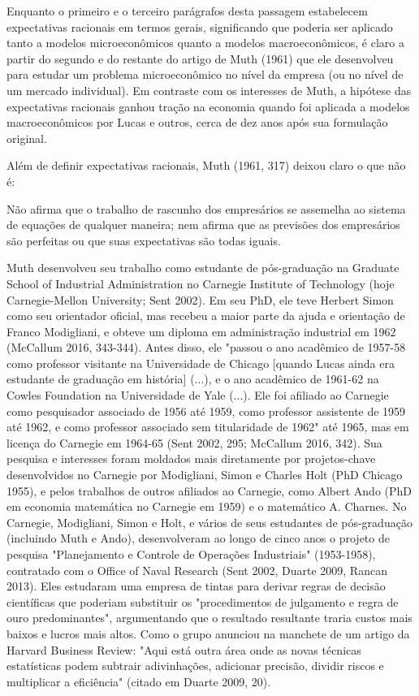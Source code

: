 \documentclass[12pt]{article}
\begin{document}
Enquanto o primeiro e o terceiro parágrafos desta passagem estabelecem expectativas racionais em termos gerais, significando que poderia ser aplicado tanto a modelos microeconômicos quanto a modelos macroeconômicos, é claro a partir do segundo e do restante do artigo de Muth (1961) que ele desenvolveu para estudar um problema microeconômico no nível da empresa (ou no nível de um mercado individual). Em contraste com os interesses de Muth, a hipótese das expectativas racionais ganhou tração na economia quando foi aplicada a modelos macroeconômicos por Lucas e outros, cerca de dez anos após sua formulação original.

Além de definir expectativas racionais, Muth (1961, 317) deixou claro o que não é:

Não afirma que o trabalho de rascunho dos empresários se assemelha ao sistema de equações de qualquer maneira; nem afirma que as previsões dos empresários são perfeitas ou que suas expectativas são todas iguais.

Muth desenvolveu seu trabalho como estudante de pós-graduação na Graduate School of Industrial Administration no Carnegie Institute of Technology (hoje Carnegie-Mellon University; Sent 2002). Em seu PhD, ele teve Herbert Simon como seu orientador oficial, mas recebeu a maior parte da ajuda e orientação de Franco Modigliani, e obteve um diploma em administração industrial em 1962 (McCallum 2016, 343-344). Antes disso, ele "passou o ano acadêmico de 1957-58 como professor visitante na Universidade de Chicago [quando Lucas ainda era estudante de graduação em história] (...), e o ano acadêmico de 1961-62 na Cowles Foundation na Universidade de Yale (...). Ele foi afiliado ao Carnegie como pesquisador associado de 1956 até 1959, como professor assistente de 1959 até 1962, e como professor associado sem titularidade de 1962" até 1965, mas em licença do Carnegie em 1964-65 (Sent 2002, 295; McCallum 2016, 342).
Sua pesquisa e interesses foram moldados mais diretamente por projetos-chave desenvolvidos no Carnegie por Modigliani, Simon e Charles Holt (PhD Chicago 1955), e pelos trabalhos de outros afiliados ao Carnegie, como Albert Ando (PhD em economia matemática no Carnegie em 1959) e o matemático A. Charnes. No Carnegie, Modigliani, Simon e Holt, e vários de seus estudantes de pós-graduação (incluindo Muth e Ando), desenvolveram ao longo de cinco anos o projeto de pesquisa "Planejamento e Controle de Operações Industriais" (1953-1958), contratado com o Office of Naval Research (Sent 2002, Duarte 2009, Rancan 2013). Eles estudaram uma empresa de tintas para derivar regras de decisão científicas que poderiam substituir os "procedimentos de julgamento e regra de ouro predominantes", argumentando que o resultado resultante traria custos mais baixos e lucros mais altos. Como o grupo anunciou na manchete de um artigo da Harvard Business Review: "Aqui está outra área onde as novas técnicas estatísticas podem subtrair adivinhações, adicionar precisão, dividir riscos e multiplicar a eficiência" (citado em Duarte 2009, 20).
\end{document}
